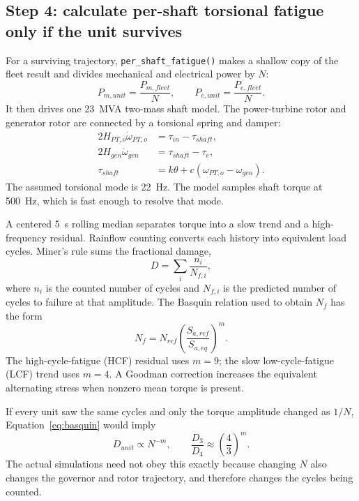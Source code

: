 \documentclass[11pt]{article}
\begin{document}
\subsection{Step 4: calculate per-shaft torsional fatigue only if the unit survives}

For a surviving trajectory, \texttt{per\_shaft\_fatigue()} makes a shallow
copy of the fleet result and divides mechanical and electrical power by $N$:
\begin{equation}
  P_{m,unit}=\frac{P_{m,fleet}}{N},\qquad
  P_{e,unit}=\frac{P_{e,fleet}}{N}.
  \label{eq:per-shaft-power}
\end{equation}
It then drives one \SI{23}{MVA} two-mass shaft model.  The power-turbine rotor
and generator rotor are connected by a torsional spring and damper:
\begin{align}
  2H_{PT,o}\dot\omega_{PT,o} &= \tau_{in}-\tau_{shaft},\\
  2H_{gen}\dot\omega_{gen} &= \tau_{shaft}-\tau_e,\\
  \tau_{shaft} &= k\theta+c(\omega_{PT,o}-\omega_{gen}).
  \label{eq:torsional-fleet}
\end{align}
The assumed torsional mode is \SI{22}{Hz}.  The model samples shaft torque at
\SI{500}{Hz}, which is fast enough to resolve that mode.

A centered \SI{5}{s} rolling median separates torque into a slow trend and a
high-frequency residual.  Rainflow counting converts each history into
equivalent load cycles.  Miner's rule sums the fractional damage,
\begin{equation}
  D=\sum_i\frac{n_i}{N_{f,i}},
\end{equation}
where $n_i$ is the counted number of cycles and $N_{f,i}$ is the predicted
number of cycles to failure at that amplitude.  The Basquin relation used to
obtain $N_f$ has the form
\begin{equation}
  N_f=N_{ref}\left(\frac{S_{a,ref}}{S_{a,eq}}\right)^m.
  \label{eq:basquin}
\end{equation}
The high-cycle-fatigue (HCF) residual uses $m=9$; the slow
low-cycle-fatigue (LCF) trend uses $m=4$.  A Goodman correction increases the
equivalent alternating stress when nonzero mean torque is present.

If every unit saw the same cycles and only the torque amplitude changed as
$1/N$, Equation~\ref{eq:basquin} would imply
\begin{equation}
  D_{unit}\propto N^{-m},\qquad
  \frac{D_3}{D_4}\approx\left(\frac{4}{3}\right)^m.
  \label{eq:fleet-basquin-scaling}
\end{equation}
The actual simulations need not obey this exactly because changing $N$ also
changes the governor and rotor trajectory, and therefore changes the cycles
being counted.
\end{document}
